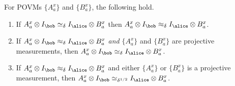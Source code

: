 \begin{fact}
\hypertarget{000Q}{}
\reversemarginpar{}
  \label{fact:agreement}
  For POVMs $\{A^x_a\}$ and $\{B^x_a\}$, the following hold.
  \begin{enumerate}
  \item If $A^x_a \otimes I_\bob \simeq_\delta I_\alice \otimes B^x_a$ then
    $A^x_a \otimes I_\bob \approx_\delta I_\alice \otimes B^x_a$.
\hypertarget{000R}{}
\reversemarginpar{}
    \label{item:consistency-implies-approx}
  \item If $A^x_a \otimes I_\bob \approx_\delta I_\alice \otimes B^x_a$
    \emph{and} $\{A^x_a\}$ and $\{B^x_a\}$ are projective measurements, then
    $A^x_a \otimes I_\bob \simeq_\delta I_\alice \otimes B^x_a$.
\hypertarget{000S}{}
\reversemarginpar{}
    \label{item:both-projectors-implies-consistency}
  \item If $A^x_a \otimes I_\bob \approx_\delta I_\alice \otimes B^x_a$ and
    either $\{A^x_a\}$ or $\{B^x_a\}$ is a projective measurement, then
    $A^x_a \otimes I_\bob \simeq_{\delta^{1/2}} I_\alice \otimes B^x_a$.
\hypertarget{000T}{}
\reversemarginpar{}
    \label{item:one-projector-implies-consistency}
  \end{enumerate}
\end{fact}

